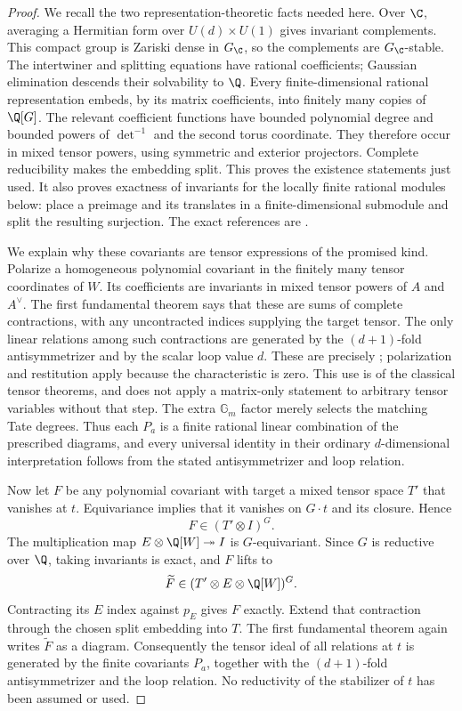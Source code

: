 \begin{proof}
We recall the two representation-theoretic facts needed here.
Over $\C$, averaging a Hermitian form over
$U(d)\times U(1)$ gives invariant complements.  This compact group
is Zariski dense in $G_\C$, so the complements are $G_\C$-stable.
The intertwiner and splitting equations have rational coefficients;
Gaussian elimination descends their solvability to $\Q$.
Every finite-dimensional rational representation embeds, by its
matrix coefficients, into finitely many copies of $\Q[G]$.
The relevant coefficient functions have bounded polynomial degree
and bounded powers of $\det^{-1}$ and the second torus coordinate.
They therefore occur in mixed tensor powers, using symmetric and
exterior projectors.  Complete reducibility makes the embedding
split.  This proves the existence statements just used.  It also
proves exactness of invariants for the locally finite rational
modules below: place a preimage and its translates in a
finite-dimensional submodule and split the resulting surjection.
The exact references are \citet[Theorem~4.14, pp.~88--89;
Theorem~22.42, pp.~478--479; Remark~12.53(a), p.~248,
and the Reynolds operator on p.~249]{c_milneag2022}.

We explain why these covariants are tensor expressions of the promised
kind.  Polarize a homogeneous polynomial covariant in the finitely
many tensor coordinates of $W$.  Its coefficients are invariants in
mixed tensor powers of $A$ and $A^\vee$.  The first fundamental
theorem says that these are sums of complete contractions, with any
uncontracted indices supplying the target tensor.  The only linear
relations among such contractions are generated by the
$(d+1)$-fold antisymmetrizer and by the scalar loop value $d$.
These are precisely \citet[Theorems~1.2--1.5, pp.~4--5]{c_procesi2021tensor};
polarization and restitution apply because the characteristic is zero.
This use is of the classical tensor theorems, and does not apply a
matrix-only statement to arbitrary tensor variables without that step.
The extra $\mathbb G_m$ factor merely selects the matching Tate
degrees.  Thus each $P_a$ is a finite rational linear combination of
the prescribed diagrams, and every universal identity in their
ordinary $d$-dimensional interpretation follows from the stated
antisymmetrizer and loop relation.

Now let $F$ be any polynomial covariant with target a mixed tensor
space $T'$ that vanishes at $t$.  Equivariance implies that it
vanishes on $G\cdot t$ and its closure.  Hence
\[
 F\in(T'\otimes I)^G.
\]
The multiplication map $E\otimes\Q[W]\twoheadrightarrow I$ is
$G$-equivariant.  Since $G$ is reductive over $\Q$, taking invariants
is exact, and $F$ lifts to
\[
 \widetilde F\in(T'\otimes E\otimes\Q[W])^G.
\]
Contracting its $E$ index against $p_E$ gives $F$ exactly.  Extend
that contraction through the chosen split embedding into $T$.
The first fundamental theorem again writes $\widetilde F$ as a
diagram.  Consequently the tensor ideal of all relations at $t$
is generated by the finite covariants $P_a$, together with the
$(d+1)$-fold antisymmetrizer and the loop relation.  No reductivity
of the stabilizer of $t$ has been assumed or used.


\end{proof}
